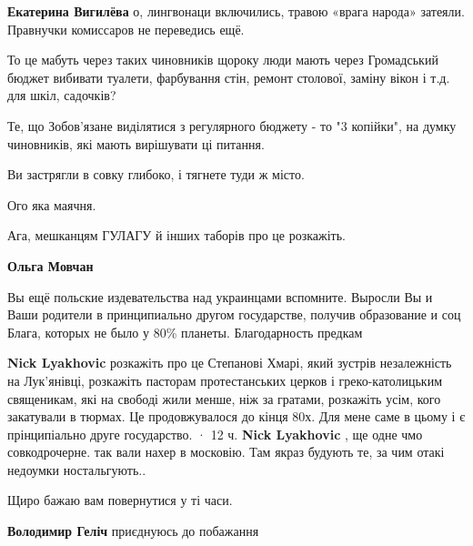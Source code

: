 \begin{itemize}
\begin{itemize} %
\textbf{Екатерина Вигилёва} о, лингвонаци включились, травою «врага народа» затеяли. Правнучки комиссаров не переведись ещё.
\end{itemize} %


То це мабуть через таких чиновників щороку люди мають через Громадський бюджет
вибивати туалети, фарбування стін, ремонт столової, заміну вікон і т.д. для
шкіл, садочків?

Те, що Зобов'язане виділятися з регулярного бюджету - то "3 копійки", на думку
чиновників, які мають вирішувати ці питання.

Ви застрягли в совку глибоко, і тягнете туди ж місто.

Ого яка маячня.

Ага, мешканцям ГУЛАГУ й інших таборів про це розкажіть.

\begin{itemize} %
\textbf{Ольга Мовчан} 

Вы ещё польские издевательства над украинцами вспомните.
Выросли Вы и Ваши родители в принципиально другом государстве, получив
образование и соц Блага, которых не было у 80\% планеты. Благодарность предкам

\textbf{Nick Lyakhovic} розкажіть про це Степанові Хмарі, який зустрів незалежність на Лук'янівці, розкажіть пасторам протестанських церков і греко-католицьким священикам, які на свободі жили менше, ніж за гратами, розкажіть усім, кого закатували в тюрмах. Це продовжувалося до кінця 80х. Для мене саме в цьому і є прінципіально друге государство.
 · 12 ч.
\textbf{Nick Lyakhovic} , ще одне чмо совкодрочерне. так вали нахер в московію. Там якраз будують те, за чим отакі недоумки ностальгують..
\end{itemize} %

Щиро бажаю вам повернутися у ті часи.

\begin{itemize} %
\textbf{Володимир Геліч} приєднуюсь до побажання
\end{itemize} %



\end{itemize}
